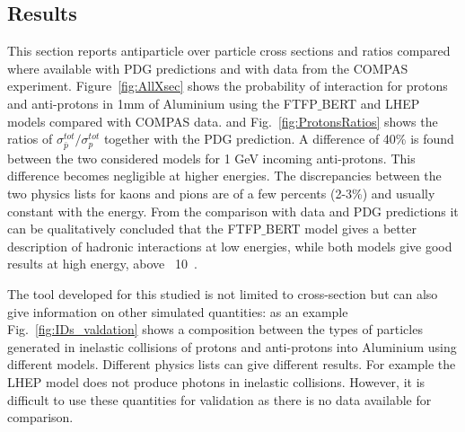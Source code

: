 \subsection{Results}

This section reports antiparticle over particle cross sections and ratios
compared where available with PDG predictions and with data from the COMPAS experiment.
%
Figure~\ref{fig:AllXsec} shows the probability of interaction for protons and anti-protons in 1mm of Aluminium
using the FTFP$\_$BERT and LHEP models compared with COMPAS data.
and Fig.~\ref{fig:ProtonsRatios} shows the ratios of $\sigma^{tot}_{\bar{p}} / \sigma^{tot}_{p}$
together with the PDG prediction. 
%
A difference of 40\% is found between the two considered models for 1 GeV incoming anti-protons.
This difference becomes negligible at higher energies. The discrepancies between the two physics lists
for kaons and pions are of a few percents (2-3\%) and usually constant with the energy. From the comparison 
with data and PDG predictions it can be qualitatively concluded that the FTFP$\_$BERT model gives a better
description of hadronic interactions at low energies, while both models give good results at high energy, above ~10~\gev.

The tool developed for this studied is not limited to cross-section but can also give information on other simulated quantities:
as an example Fig.~\ref{fig:IDs_valdation} shows a composition between the types of particles generated in inelastic
collisions of protons and anti-protons into Aluminium using different models. Different physics lists can give different results.
For example the LHEP model does not produce photons in inelastic collisions. However, it is difficult to use these
quantities for validation as there is no data available for comparison.


